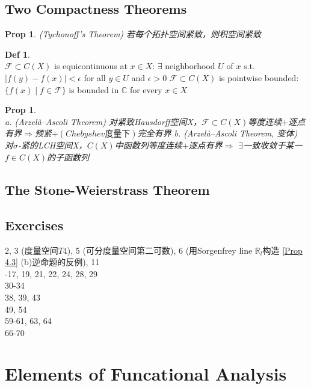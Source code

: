 \documentclass[hidelinks]{article}
\theoremstyle{definition}
\newtheorem*{defin}{Def}
\theoremstyle{plain}
\newtheorem{proposition}[theorem]{Prop}
\theoremstyle{remark}
\begin{document}
\subsection{Two Compactness Theorems}
\begin{proposition}(Tychonoff's Theorem)
若每个拓扑空间紧致，则积空间紧致
\end{proposition}

\begin{defin}~\\
$\mathscr{F}\subset C(X)$ is equicontinuous at $x\in X$: $\exists$ neighborhood $U$ of $x$ s.t. $|f(y)-f(x)|<\epsilon$ for all $y\in U$ and $\epsilon>0$ \newline
$\mathscr{F}\subset C(X)$ is pointwise bounded: $\{f(x)\mid f\in \mathscr{F}\}$ is bounded in $\mathbb{C}$ for every $x\in X$
\end{defin}

\begin{proposition}~\\
a. (Arzelà–Ascoli Theorem) 对紧致Hausdorff空间X，$\mathscr{F}\subset C(X)$等度连续$+$逐点有界$\Rightarrow$预紧$+$$(Chebyshev\textrm{度量下})$完全有界 \newline
b. (Arzelà–Ascoli Theorem, 变体) 对$\sigma$-紧的LCH空间X，$C(X)$中函数列等度连续$+$逐点有界$\Rightarrow$ $\exists$一致收敛于某一$f\in C(X)$的子函数列
\end{proposition}



\subsection{The Stone-Weierstrass Theorem}



\subsection{Exercises}
2, 3 (度量空间$T4$), 5 (可分度量空间第二可数), 6 (用Sorgenfrey line $\mathbb{R}_l$构造 \autoref{Prop 4.3} (b)逆命题的反例), 11 \\
-17, 19, 21, 22, 24, 28, 29 \\
30-34 \\
38, 39, 43 \\
49, 54 \\
59-61, 63, 64 \\
66-70 \\
\newpage


\section{Elements of Funcational Analysis}
\end{document}
